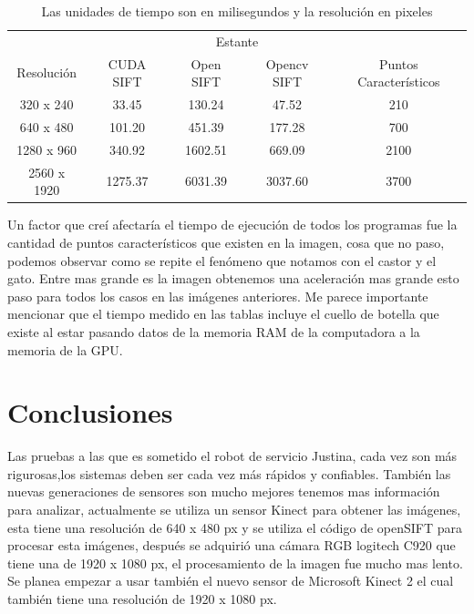 \begin{table}[phtb]
\centering
\begin{tabular}{|c|c|c|c|c|}
\hline

\multicolumn{5}{|c|}{Estante} \\
\cline{1-5}
Resolución & CUDA SIFT & Open SIFT & Opencv SIFT & Puntos Característicos\\
\hline \hline
 320 x 240  & 33.45   & 130.24   & 47.52   & 210\\ \cline{1-5}
 640 x 480  & 101.20  &  451.39  & 177.28  & 700\\ \cline{1-5}
1280 x 960  & 340.92  &  1602.51 & 669.09  & 2100\\ \cline{1-5}
2560 x 1920 & 1275.37 &  6031.39 & 3037.60 & 3700\\ \cline{1-5}

\end{tabular}
\caption{Las unidades de tiempo son en milisegundos y la resolución en pixeles}
\label{tabla:final}
\end{table}

Un factor que creí afectaría el tiempo de ejecución de todos los programas fue la cantidad de puntos característicos que existen en la imagen, cosa que no paso, podemos observar como se repite el fenómeno que notamos con el castor y el gato. Entre mas grande es la imagen obtenemos una aceleración mas grande esto paso para todos los casos en las imágenes anteriores. Me parece importante mencionar que el tiempo medido en las tablas incluye el cuello de botella que existe al estar pasando datos de la memoria RAM de la computadora a la memoria de la GPU.     

\pagebreak
\section{Conclusiones}

 Las pruebas a las que es sometido el robot de servicio Justina, cada vez son más rigurosas,los sistemas deben ser cada vez más rápidos y confiables. También las nuevas generaciones de sensores son mucho mejores tenemos mas información para analizar, actualmente se utiliza un sensor Kinect para obtener las imágenes, esta tiene una resolución de  640 x 480 px y se utiliza el código de openSIFT para procesar esta imágenes, después     se adquirió una cámara RGB logitech C920 que tiene una  de 1920 x 1080 px, el procesamiento de la imagen fue mucho mas lento. Se planea empezar a usar también el nuevo sensor de Microsoft Kinect 2 el cual también tiene una resolución de 1920 x 1080 px. 
 
